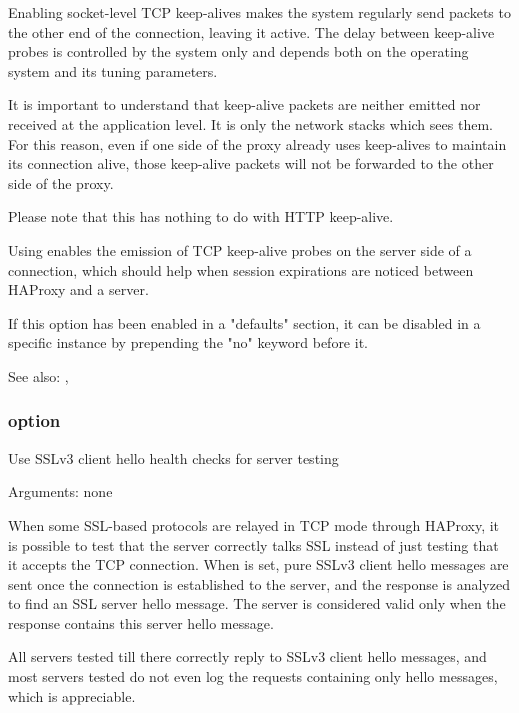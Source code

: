 {  Enabling socket-level TCP keep-alives makes the system regularly send packets
  to the other end of the connection, leaving it active. The delay between
  keep-alive probes is controlled by the system only and depends both on the
  operating system and its tuning parameters.

  It is important to understand that keep-alive packets are neither emitted nor
  received at the application level. It is only the network stacks which sees
  them. For this reason, even if one side of the proxy already uses keep-alives
  to maintain its connection alive, those keep-alive packets will not be
  forwarded to the other side of the proxy.

  Please note that this has nothing to do with HTTP keep-alive.

  Using  enables the emission of TCP keep-alive probes on the
  server side of a connection, which should help when session expirations are
  noticed between HAProxy and a server.

  If this option has been enabled in a "defaults" section, it can be disabled
  in a specific instance by prepending the "no" keyword before it.

  See also: , 

\subsubsection[ssl-hello-chk]{option }


  Use SSLv3 client hello health checks for server testing


  Arguments: none

  When some SSL-based protocols are relayed in TCP mode through HAProxy, it is
  possible to test that the server correctly talks SSL instead of just testing
  that it accepts the TCP connection. When  is set, pure
  SSLv3 client hello messages are sent once the connection is established to
  the server, and the response is analyzed to find an SSL server hello message.
  The server is considered valid only when the response contains this server
  hello message.

  All servers tested till there correctly reply to SSLv3 client hello messages,
  and most servers tested do not even log the requests containing only hello
  messages, which is appreciable.

}
